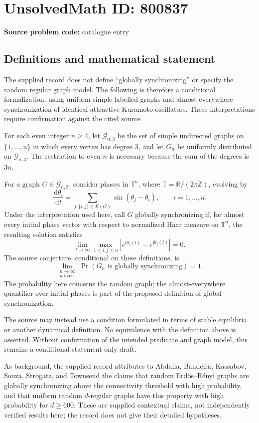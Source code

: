\documentclass[11pt]{article}
\newcommand{\Z}{\mathbb{Z}}
\newcommand{\R}{\mathbb{R}}
\newcommand{\dd}{\,\mathrm{d}}
\begin{document}
\section*{UnsolvedMath ID: 800837}
\textbf{Source problem code:} catalogue entry
\subsection{Definitions and mathematical statement}
The supplied record does not define ``globally synchronizing'' or specify the random regular graph model. The following is therefore a conditional formalization, using uniform simple labelled graphs and almost-everywhere synchronization of identical attractive Kuramoto oscillators. These interpretations require confirmation against the cited source.

For each even integer \(n\geq 4\), let \(\mathcal G_{n,3}\) be the set of simple undirected graphs on \(\{1,\ldots,n\}\) in which every vertex has degree \(3\), and let \(G_n\) be uniformly distributed on \(\mathcal G_{n,3}\). The restriction to even \(n\) is necessary because the sum of the degrees is \(3n\).

For a graph \(G\in\mathcal G_{n,3}\), consider phases in \(\mathbb T^n\), where \(\mathbb T=\R/(2\pi\Z)\), evolving by
\[
\frac{\dd\theta_i}{\dd t}=\sum_{j:\{i,j\}\in E(G)}\sin(\theta_j-\theta_i),\qquad i=1,\ldots,n.
\]
Under the interpretation used here, call \(G\) globally synchronizing if, for almost every initial phase vector with respect to normalized Haar measure on \(\mathbb T^n\), the resulting solution satisfies
\[
\lim_{t\to\infty}\max_{1\leq i,j\leq n}\left|e^{\mathrm{i}\theta_i(t)}-e^{\mathrm{i}\theta_j(t)}\right|=0.
\]
The source conjecture, conditional on these definitions, is
\[
\lim_{\substack{n\to\infty\\ n\text{ even}}}\Pr\!\left(G_n\text{ is globally synchronizing}\right)=1.
\]
The probability here concerns the random graph; the almost-everywhere quantifier over initial phases is part of the proposed definition of global synchronization.

The source may instead use a condition formulated in terms of stable equilibria or another dynamical definition. No equivalence with the definition above is asserted. Without confirmation of the intended predicate and graph model, this remains a conditional statement-only draft.

As background, the supplied record attributes to Abdalla, Bandeira, Kassabov, Souza, Strogatz, and Townsend the claims that random Erd\H{o}s--R\'enyi graphs are globally synchronizing above the connectivity threshold with high probability, and that uniform random \(d\)-regular graphs have this property with high probability for \(d\geq 600\). These are supplied contextual claims, not independently verified results here; the record does not give their detailed hypotheses.
\end{document}
